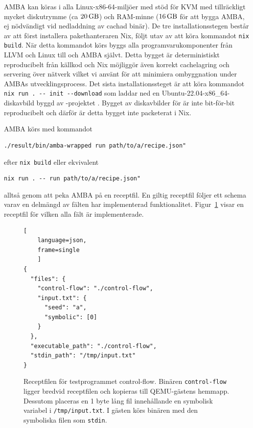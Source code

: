 AMBA kan köras i alla Linux-x86-64-miljöer med stöd för KVM med tillräckligt
mycket diskutrymme (ca $\SI{20}{\giga\byte}$) och RAM-minne
($\SI{16}{\giga\byte}$ för att bygga AMBA, ej nödvändigt vid nedladdning av
cachad binär). De tre installationsstegen består av att först installera
pakethanteraren Nix, följt utav av att köra kommandot \lstinline{nix build}.  När
detta kommandot körs byggs alla programvarukomponenter från LLVM och Linux till
\stoe{} och AMBA självt. Detta bygget är deterministiskt reproducibelt från
källkod och Nix möjliggör även korrekt cachelagring och servering över nätverk
vilket vi använt för att minimiera ombyggnation under AMBAs utvecklingsprocess.
Det sista installationssteget är att köra kommandot
\lstinline{nix run . -- init --download}
som laddar ned en Ubuntu-22.04-x86\_64-diskavbild byggd av \stoe{}-projektet
. Bygget av diskavbilder för \stoe{} är inte bit-för-bit reproducibelt
och därför är detta bygget inte packeterat i Nix.

AMBA körs med kommandot
\begin{verbatim}
./result/bin/amba-wrapped run path/to/a/recipe.json"
\end{verbatim}
efter \lstinline{nix build} eller ekvivalent
\begin{verbatim}
nix run . -- run path/to/a/recipe.json"
\end{verbatim}
alltså genom att peka AMBA på en receptfil. En giltig receptfil följer ett
schema varav en delmängd av fälten har implementerad funktionalitet.
Figur~\ref{fig:recipe} visar en receptfil för vilken alla fält är
implementerade.

\begin{figure}
    \begin{lstlisting}[
    language=json,
    frame=single
    ]
{
  "files": {
    "control-flow": "./control-flow",
    "input.txt": {
      "seed": "a",
      "symbolic": [0]
    }
  },
  "executable_path": "./control-flow",
  "stdin_path": "/tmp/input.txt"
}
\end{lstlisting}

    \caption{
        Receptfilen för testprogrammet control-flow. Binären
        \texttt{control-flow} ligger bredvid receptfilen och kopieras till
        QEMU-gästens hemmapp. Dessutom placeras en 1 byte lång fil innehållande en
        symbolisk variabel i \texttt{/tmp/input.txt}. I gästen körs binären med den
        symboliska filen som \texttt{stdin}.
    }\label{fig:recipe}

\end{figure}


